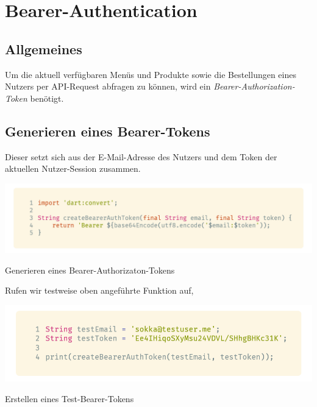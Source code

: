 \section{Bearer-Authentication}
\label{clientbearerauth}

\subsection{Allgemeines}

Um die aktuell verfügbaren Menüs und Produkte sowie die Bestellungen eines Nutzers per API-Request
abfragen zu können, wird ein \textit{Bearer-Authorization-Token} benötigt.

\subsection{Generieren eines Bearer-Tokens}

Dieser setzt sich aus der E-Mail-Adresse des Nutzers und dem Token der aktuellen
Nutzer-Session zusammen.

\begin{code}[H]
    \centering
    \includegraphics[width=1\textwidth]{images/Client/services/bearer-auth/generateBearerToken.png}
    \vspace{-25pt}
    \caption{Generieren eines Bearer-Authorizaton-Tokens}
\end{code}

\newpage

Rufen wir testweise oben angeführte Funktion auf,

\begin{code}[H]
    \centering
    \includegraphics[width=1\textwidth]{images/Client/services/bearer-auth/callGenerateBearerToken.png}
    \vspace{-25pt}
    \caption{Erstellen eines Test-Bearer-Tokens}
\end{code}

